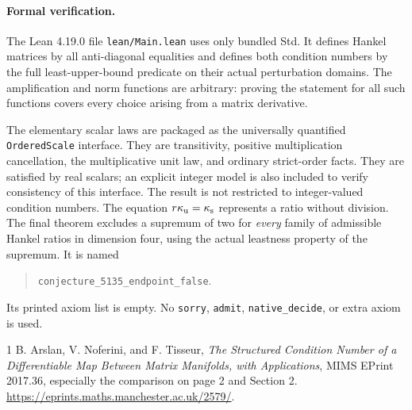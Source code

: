 \documentclass[11pt]{article}
\begin{document}
\newpage
\paragraph{Formal verification.}
The Lean 4.19.0 file \texttt{lean/Main.lean} uses only bundled Std.
It defines Hankel matrices by all anti-diagonal equalities and defines
both condition numbers by the full least-upper-bound predicate on their
actual perturbation domains. The amplification and norm functions are
arbitrary: proving the statement for all such functions covers every
choice arising from a matrix derivative.

The elementary scalar laws are packaged as the universally quantified
\texttt{OrderedScale} interface. They are transitivity, positive
multiplication cancellation, the multiplicative unit law, and ordinary
strict-order facts. They are satisfied by real scalars; an explicit
integer model is also included to verify consistency of this interface.
The result is not restricted to integer-valued condition numbers.
The equation $r\kappa_{\rm u}=\kappa_{\rm s}$ represents a ratio without
division. The final theorem excludes a supremum of two for \emph{every}
family of admissible Hankel ratios in dimension four, using the actual
leastness property of the supremum. It is named
\begin{quote}\texttt{conjecture\_5135\_endpoint\_false}.\end{quote}
Its printed axiom list is empty. No \texttt{sorry}, \texttt{admit},
\texttt{native\_decide}, or extra axiom is used.

\begin{thebibliography}{1}
B. Arslan, V. Noferini, and F. Tisseur,
\emph{The Structured Condition Number of a Differentiable Map Between
Matrix Manifolds, with Applications}, MIMS EPrint 2017.36,
especially the comparison on page 2 and Section 2.
\url{https://eprints.maths.manchester.ac.uk/2579/}.
\end{thebibliography}
\end{document}
